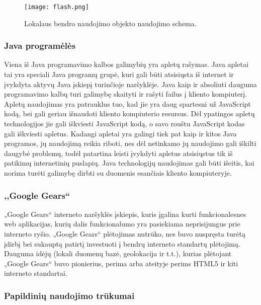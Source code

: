 \documentclass[12pt,a4paper,titlepage]{article}
\begin{document}
\begin{figure}[htb]
\begin{center}
\leavevmode
\texttt{[image: flash.png]}
\end{center}
\caption{Lokalaus bendro naudojimo objekto naudojimo schema.}
\label{fig:flash}
\end{figure}

\subsubsection{Java programėlės}

Viena iš Java programavimo kalbos galimybių yra apletų rašymas. Java apletai tai yra speciali Java programų grupė, kuri gali būti atsisiųsta iš internet ir įvykdyta aktyvų Java įskiepį turinčioje naršyklėje. Java kaip ir absoliuti dauguma programavimo kalbų turi galimybę skaityti ir rašyti failus į kliento kompiuterį. Apletų naudojimas yra patrauklus tuo, kad jie yra daug spartesni už JavaScript kodą, bei gali geriau išnaudoti kliento kompiuterio resursus. Dėl ypatingos apletų technologijos jie gali iškviesti JavaScript kodą, o savo rouštu JavaScript kodas gali iškviesti apletus. Kadangi apletai yra galingi tiek pat kaip ir kitos Java programos, jų naudojimą reikia riboti, nes dėl netinkamo jų naudojimo gali iškilti daugybė problemų, todėl patartina leisti įvykdyti apletus atsisiųstus tik iš patikimų internetinių puslapių. Java technologijų naudojimas gali būti išeitis, kai norima turėti galimybę dirbti su duomenis esančiais kliento kompiuteryje.

\subsubsection{,,Google Gears``}

„Google Gears“ interneto naršyklės įskiepis, kuris įgalina kurti funkcionalesnes web aplikacijas, kurių dalis funkcionalumo yra pasiekiama neprisijungus prie interneto ryšio.
„Google Gears“ plėtojimas nutrūko, nes buvo nuspręsta turėtą įdirbį bei sukauptą patirtį investuoti į bendrų interneto standartų plėtojimą. Dauguma idėjų (lokali duomenų bazė, geolokacija ir t.t.), kurias plėtojant „Google Gears“ buvo pionierius, perima arba ateityje perims HTML5 ir kiti interneto standartai.

\subsubsection{Papildinių naudojimo trūkumai}
\end{document}
